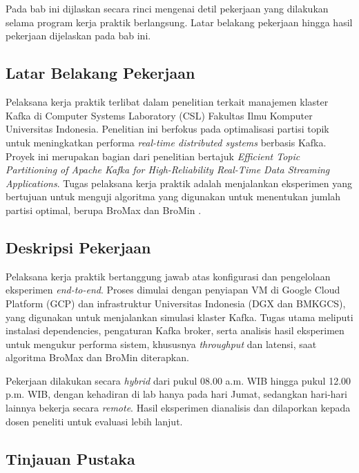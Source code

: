 \chapter{\babDua}
\label{bab:2}
Pada bab ini dijlaskan secara rinci mengenai detil pekerjaan yang dilakukan selama program kerja praktik berlangsung. Latar belakang pekerjaan hingga hasil pekerjaan dijelaskan pada bab ini.

\section{Latar Belakang Pekerjaan}

Pelaksana kerja praktik terlibat dalam penelitian terkait manajemen klaster Kafka di Computer Systems Laboratory (CSL) Fakultas Ilmu Komputer Universitas Indonesia. Penelitian ini berfokus pada optimalisasi partisi topik untuk meningkatkan performa \textit{real-time distributed systems} berbasis Kafka. Proyek ini merupakan bagian dari penelitian bertajuk \textit{Efficient Topic Partitioning of Apache Kafka for High-Reliability Real-Time Data Streaming Applications}. Tugas pelaksana kerja praktik adalah menjalankan eksperimen yang bertujuan untuk menguji algoritma yang digunakan untuk menentukan jumlah partisi optimal, berupa BroMax dan BroMin \citep{elsevier:kafka}.

\section{Deskripsi Pekerjaan}

Pelaksana kerja praktik bertanggung jawab atas konfigurasi dan pengelolaan eksperimen \textit{end-to-end}. Proses dimulai dengan penyiapan VM di Google Cloud Platform (GCP) dan infrastruktur Universitas Indonesia (DGX dan BMKGCS), yang digunakan untuk menjalankan simulasi klaster Kafka. Tugas utama meliputi instalasi dependencies, pengaturan Kafka broker, serta analisis hasil eksperimen untuk mengukur performa sistem, khususnya \textit{throughput} dan latensi, saat algoritma BroMax dan BroMin diterapkan.

Pekerjaan dilakukan secara \textit{hybrid} dari pukul 08.00 a.m. WIB hingga pukul 12.00 p.m. WIB, dengan kehadiran di lab hanya pada hari Jumat, sedangkan hari-hari lainnya bekerja secara \textit{remote}. Hasil eksperimen dianalisis dan dilaporkan kepada dosen peneliti untuk evaluasi lebih lanjut.

\section{Tinjauan Pustaka}


